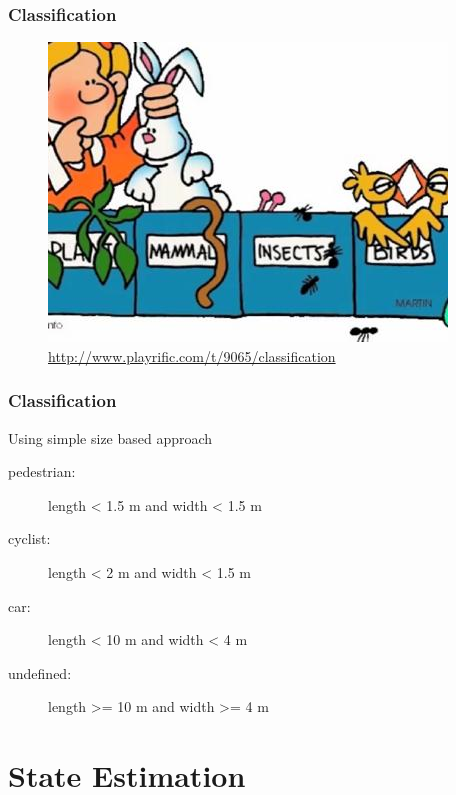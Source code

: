 \documentclass[nosymbols]{beamer}	%
\begin{document}
\begin{frame}
\frametitle{Classification}
\begin{figure}[!ht]
\begin{center}
\includegraphics[width=\textwidth,height=0.7\textheight,keepaspectratio]{bilder/animals_classifications_song.png}\\
\tiny{\url{http://www.playrific.com/t/9065/classification}}
\end{center}
\end{figure}
\end{frame}



\begin{frame}
\frametitle{Classification}
Using simple size based approach

\begin{description}
\item[pedestrian:] length < 1.5 m and width < 1.5 m
\item[cyclist:] length < 2 m and width < 1.5 m
\item[car:] length < 10 m and width < 4 m
\item[undefined:] length >= 10 m and width >= 4 m
\end{description}

\end{frame}


\section{State Estimation}
\end{document}
